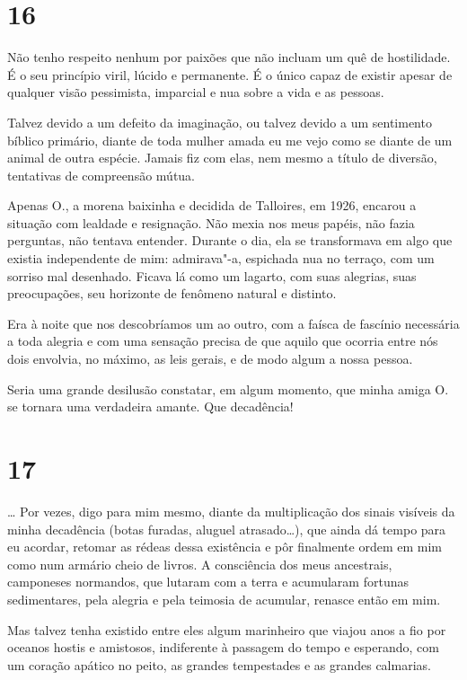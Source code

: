 \section{16}

Não tenho respeito nenhum por paixões que não incluam um quê de
hostilidade. É o seu princípio viril, lúcido e permanente. É o único
capaz de existir apesar de qualquer visão pessimista, imparcial e nua
sobre a vida e as pessoas.

Talvez devido a um defeito da imaginação, ou talvez devido a um
sentimento bíblico primário, diante de toda mulher amada eu me vejo como
se diante de um animal de outra espécie. Jamais fiz com elas, nem mesmo
a título de diversão, tentativas de compreensão mútua.

Apenas O., a morena baixinha e decidida de Talloires, em 1926, encarou a
situação com lealdade e resignação. Não mexia nos meus papéis, não fazia
perguntas, não tentava entender. Durante o dia, ela se transformava em
algo que existia independente de mim: admirava"-a, espichada nua no
terraço, com um sorriso mal desenhado. Ficava lá como um lagarto, com
suas alegrias, suas preocupações, seu horizonte de fenômeno natural e
distinto.

Era à noite que nos descobríamos um ao outro, com a faísca de fascínio
necessária a toda alegria e com uma sensação precisa de que aquilo que
ocorria entre nós dois envolvia, no máximo, as leis gerais, e de modo
algum a nossa pessoa.

Seria uma grande desilusão constatar, em algum momento, que minha amiga
O. se tornara uma verdadeira amante. Que decadência!

\section{17}

\ldots{} Por vezes, digo para mim mesmo, diante da multiplicação dos
sinais visíveis da minha decadência (botas furadas, aluguel
atrasado\ldots{}), que ainda dá tempo para eu acordar, retomar as rédeas
dessa existência e pôr finalmente ordem em mim como num armário cheio de
livros. A consciência dos meus ancestrais, camponeses normandos, que
lutaram com a terra e acumularam fortunas sedimentares, pela alegria e
pela teimosia de acumular, renasce então em mim.

Mas talvez tenha existido entre eles algum marinheiro que viajou anos a
fio por oceanos hostis e amistosos, indiferente à passagem do tempo e
esperando, com um coração apático no peito, as grandes tempestades e as
grandes calmarias.

